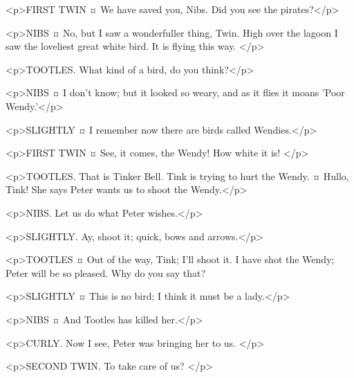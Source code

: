 <p>FIRST TWIN ¤
We have saved you, Nibs. Did you see the pirates?</p>

<p>NIBS ¤
No, but I saw a wonderfuller thing, Twin.
High over the lagoon I saw the loveliest great white bird. It is flying this way.
</p>

<p>TOOTLES. What kind of a bird, do you think?</p>

<p>NIBS ¤
I don't know; but it looked so weary, and as it flies it moans 'Poor Wendy.'</p>

<p>SLIGHTLY ¤
I remember now there are birds called Wendies.</p>

<p>FIRST TWIN ¤
See, it comes, the Wendy!
How white it is!
</p>

<p>TOOTLES. That is Tinker Bell. Tink is trying to hurt the Wendy.
¤
Hullo, Tink!
She says Peter wants us to shoot the Wendy.</p>

<p>NIBS. Let us do what Peter wishes.</p>

<p>SLIGHTLY. Ay, shoot it; quick, bows and arrows.</p>

<p>TOOTLES ¤
Out of the way, Tink; I'll shoot it.
I have shot the Wendy; Peter will be so pleased.
Why do you say that?

<p>SLIGHTLY ¤
This is no bird; I think it must be a lady.</p>

<p>NIBS ¤
And Tootles has killed her.</p>

<p>CURLY. Now I see, Peter was bringing her to us.
</p>

<p>SECOND TWIN. To take care of us?
</p>

